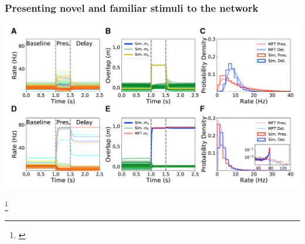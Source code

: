\documentclass{beamer}
\begin{document}
\begin{frame}[plain]
\frametitle{Presenting novel and familiar stimuli to the network}

\vspace{0.2in}

\begin{center}
\includegraphics[scale=0.4]{novel-familiar}
\end{center}

\footnote{\cite{peirera}}

\end{frame}




\begin{thebibliography}{99} 
\end{thebibliography}
\end{document}

